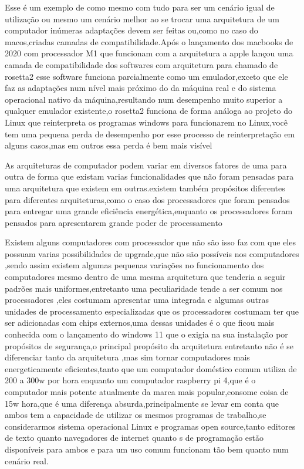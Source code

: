 \documentclass[
	12pt,				%
	openright,			%
	oneside,			%
	a4paper,			%
	english,			%
	french,				%
	spanish,			%
	brazil,				%
	]{abntex2}
\begin{document}
Esse é um exemplo de como mesmo com tudo para ser um cenário igual de utilização ou mesmo um cenário melhor ao se trocar uma arquitetura de um computador inúmeras adaptações devem ser feitas ou,como no caso do macos,criadas camadas de compatibilidade.Após o lançamento dos macbooks de 2020 com processador M1 que funcionam com a arquitetura  a apple lançou uma camada de compatibilidade dos softwares com arquitetura  para  chamado de rosetta2 esse software funciona parcialmente como um emulador,exceto que ele faz as adaptações num nível mais próximo do da máquina real e do sistema operacional nativo da máquina,resultando num desempenho muito superior a qualquer emulador existente,o rosetta2 funciona de forma análoga ao projeto  do Linux que reinterpreta os programas windows para funcionarem no Linux,você tem uma pequena perda de desempenho por esse processo de reinterpretação em alguns casos,mas em outros essa perda é bem mais visível\newline

As arquiteturas de computador podem variar em diversos fatores de uma para outra de forma que existam varias funcionalidades que não foram pensadas para uma arquitetura que existem em outras.existem também propósitos diferentes para diferentes arquiteturas,como o caso dos processadores  que foram pensados para entregar uma grande eficiência energética,enquanto os processadores  foram pensados para apresentarem grande poder de processamento\newline

Existem alguns computadores com processador  que não são  isso faz com que eles possuam varias possibilidades de upgrade,que não são possíveis nos computadores ,sendo assim existem algumas pequenas variações no funcionamento dos computadores mesmo dentro de uma mesma arquitetura que tenderia a seguir padrões mais uniformes,entretanto uma peculiaridade tende a ser comum nos processadores ,eles costumam apresentar uma  integrada e algumas outras unidades de processamento especializadas que os processadores  costumam ter que ser adicionadas com chips externos,uma dessas unidades é o  que ficou mais conhecida com o lançamento do windows 11 que o exigia na sua instalação por propósitos de segurança,o principal propósito da arquitetura  entretanto não é se diferenciar tanto da arquitetura ,mas sim tornar computadores mais energeticamente eficientes,tanto que um computador doméstico comum utiliza de 200 a 300w por hora enquanto um computador raspberry pi 4,que é o computador  mais potente atualmente da marca mais popular,consome coisa de 15w hora,que é uma diferença absurda,principalmente se levar em conta que ambos tem a capacidade de utilizar os mesmos programas de trabalho,se considerarmos sistema operacional Linux e programas open source,tanto editores de texto quanto navegadores de internet quanto s de programação estão disponíveis para ambos e para um uso comum funcionam tão bem quanto num cenário real.\newline
\end{document}
